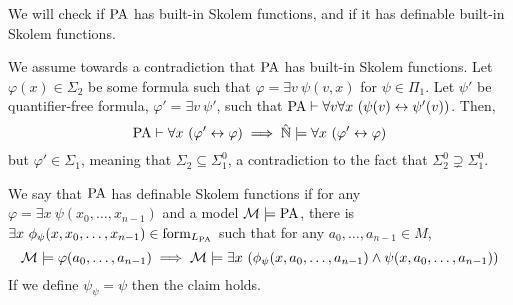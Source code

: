 \subquestion{}
We will check if $\operatorname{PA}$ has built-in Skolem functions, and if it has definable built-in Skolem functions.
\begin{solution}
	We assume towards a contradiction that $\operatorname{PA}$ has built-in Skolem functions.
	Let $\varphi(x) \in \Sigma_2$ be some formula such that $\varphi = \exists v\ \psi(v, x)$ for $\psi \in \Pi_1$.
	Let $\psi'$ be quantifier-free formula, $\varphi' = \exists v\ \psi'$, such that $\PA \vdash \forall v \forall x\ (\psi(v) \leftrightarrow \psi'(v))$.
	Then,
	\[
		\operatorname{PA} \vdash \forall x\ (\varphi' \leftrightarrow \varphi)
		\implies
		\hat{\mathbb{N}}
		\models \forall x\ (\varphi' \leftrightarrow \varphi)
	\]
	but $\varphi' \in \Sigma_1$, meaning that $\Sigma_2 \subseteq \Sigma_1^0$, a contradiction to the fact that $\Sigma_2^0 \supsetneq \Sigma_1^0$.

	We say that $\operatorname{PA}$ has definable Skolem functions if for any $\varphi = \exists x\ \psi(x_0, \ldots, x_{n - 1})$ and a model $\mathcal{M} \models \operatorname{PA}$,
	there is $\exists x\ \phi_{\psi}(x, x_0, \ldots, x_{n - 1}) \in \operatorname{form}_{L_{\operatorname{PA}}}$ such that for any $a_0, \ldots, a_{n - 1} \in M$,
	\[
		\mathcal{M} \models \varphi(a_0, \ldots, a_{n - 1})
		\implies \mathcal{M} \models \exists x\ (\phi_{\psi}(x, a_0, \ldots, a_{n - 1}) \land \psi(x, a_0, \ldots, a_{n - 1}))
	\]
	If we define $\psi_{\psi} = \psi$ then the claim holds.
\end{solution}

